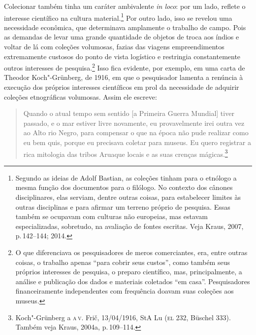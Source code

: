 Colecionar também tinha um caráter ambivalente \textit{in loco}: por um
lado, reflete o interesse científico na cultura material.\footnote{Segundo
  as ideias de Adolf Bastian, as coleções tinham para o etnólogo a mesma
  função dos documentos para o filólogo. No contexto dos cânones
  disciplinares, elas serviam, dentre outras coisas, para estabelecer
  limites às outras disciplinas e para afirmar um terreno próprio de
  pesquisa. Essas também se ocupavam com culturas não europeias, mas
  estavam especializadas, sobretudo, na avaliação de fontes escritas.
  Veja Kraus, 2007, p.\,142--144; 2014.} Por outro lado, isso se revelou
uma necessidade econômica, que determinava amplamente o trabalho de
campo. Pois as demandas de levar uma grande quantidade de objetos de
troca aos índios e voltar de lá com coleções volumosas, fazias das
viagens empreendimentos extremamente custosos do ponto de vista
logístico e restringia constantemente outros interesses de
pesquisa.\footnote{O que diferenciava os pesquisadores de meros
  comerciantes, era, entre outras coisas, o trabalho apenas ``para
  cobrir seus custos'', como também seus próprios interesses de
  pesquisa, o preparo científico, mas, principalmente, a análise e
  publicação dos dados e materiais coletados ``em casa''. Pesquisadores
  financeiramente independentes com frequência doavam suas coleções aos
  museus.} Isso fica evidente, por exemplo, em uma carta de Theodor
Koch"-Grünberg, de 1916, em que o pesquisador lamenta a renúncia à
execução dos próprios interesses científicos em prol da necessidade de
adquirir coleções etnográficas volumosas. Assim ele escreve: 

\begin{quote}
Quando o atual tempo sem sentido {[}a Primeira Guerra Mundial{]} tiver passado,
e o mar estiver livre novamente, eu provavelmente irei outra vez ao Alto
rio Negro, para compensar o que na época não pude realizar como eu bem
quis, porque eu precisava coletar para museus. Eu quero registrar a
rica mitologia das tribos Aruaque locais e as suas crenças
mágicas.\footnote{Koch"-Grünberg a \textsc{a}\,\textsc{v}. Frič, 13/04/1916, StA Lu (\textsc{el} 232, Büschel 333). Também veja Kraus, 2004a, p.\,109--114.}
\end{quote}

